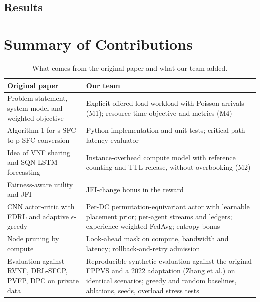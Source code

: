 \documentclass[11pt,a4paper]{article}
\begin{document}
\subsection{Results}



\section*{Summary of Contributions}

\begin{table}[H]
\centering\small
\caption{What comes from the original paper and what our team added.}
\label{tab:contrib}
\begin{tabularx}{\linewidth}{>{\raggedright\arraybackslash}X >{\raggedright\arraybackslash}X}
\toprule
Original paper~\cite{fppvs} & Our team \\
\midrule
Problem statement, system model and weighted objective & Explicit offered-load workload with Poisson arrivals (M1); resource-time objective and metrics (M4) \\
Algorithm 1 for s-SFC to p-SFC conversion & Python implementation and unit tests; critical-path latency evaluator \\
Idea of VNF sharing and SQN-LSTM forecasting & Instance-overhead compute model with reference counting and TTL release, without overbooking (M2) \\
Fairness-aware utility and JFI & JFI-change bonus in the reward \\
CNN actor-critic with FDRL and adaptive $\epsilon$-greedy & Per-DC permutation-equivariant actor with learnable placement prior; per-agent streams and ledgers; experience-weighted FedAvg; entropy bonus \\
Node pruning by compute & Look-ahead mask on compute, bandwidth and latency; rollback-and-retry admission \\
Evaluation against RVNF, DRL-SFCP, PVFP, DPC on private data & Reproducible synthetic evaluation against the original FPPVS and a 2022 adaptation (Zhang et al.) on identical scenarios; greedy and random baselines, ablations, \numSeeds{} seeds, overload stress tests \\
\bottomrule
\end{tabularx}
\end{table}

\end{document}
